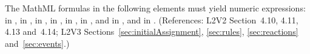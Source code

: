 The MathML formulas in the following elements must yield numeric
expressions:  in \KineticLaw,
 in \SpeciesReference,  in
\InitialAssignment,  in \AssignmentRule, 
in \RateRule,  in \AlgebraicRule, and  in
\Event, and  in \EventAssignment.  (References:
L2V2 Section~4.10, 4.11, 4.13 and~4.14; L2V3 
Sections~\ref{sec:initialAssignment}, \ref{sec:rules},
\ref{sec:reactions} and~\ref{sec:events}.)


